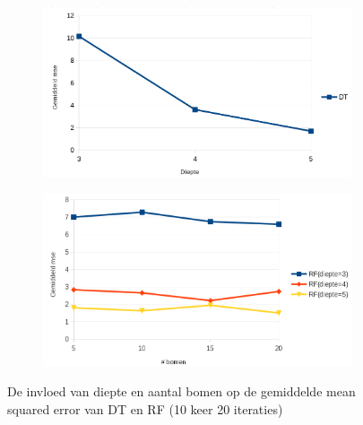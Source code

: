 \begin{figure}[t!]
\centering
\begin{subfigure}{\textwidth}
  \centering
    \hspace*{-0.75cm}                                                           
  \includegraphics[width=\linewidth]{images/evaluatie/gemiddeldmsedt.png}
\end{subfigure}
\begin{subfigure}{\textwidth}
  \centering
  \includegraphics[width=\linewidth]{images/evaluatie/gemiddeldmserf.png}
\end{subfigure}
\caption{De invloed van diepte en aantal bomen op de gemiddelde mean squared error van DT en RF (10 keer 20 iteraties)}
\label{fig:invloed diepte en aantal bomen mse}
\end{figure}
